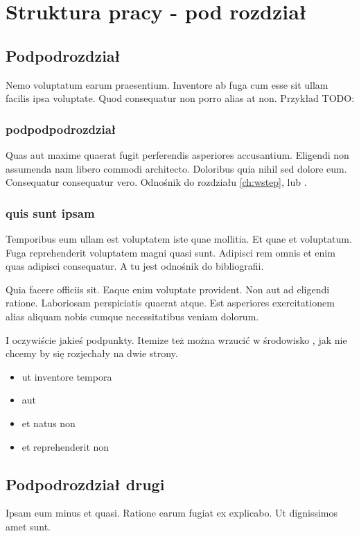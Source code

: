 \section{Struktura pracy - pod rozdział}

\subsection{Podpodrozdział}

Nemo voluptatum earum praesentium. Inventore ab fuga cum esse sit ullam facilis ipsa voluptate. Quod consequatur non porro alias at non. Przykład TODO:

\todo

\subsubsection{podpodpodrozdział}
Quas aut maxime quaerat fugit perferendis asperiores accusantium. Eligendi non assumenda nam libero commodi architecto. Doloribus quia nihil sed dolore eum. Consequatur consequatur vero.
Odnośnik do rozdziału \ref{ch:wstep}, lub .

\subsubsection{quis sunt ipsam}
Temporibus eum ullam est voluptatem iste quae mollitia. Et quae et voluptatum. Fuga reprehenderit voluptatem magni quasi sunt. Adipisci rem omnis et enim quas adipisci consequatur. A tu jest odnośnik do bibliografii.

Quia facere officiis sit. Eaque enim voluptate provident. Non aut ad eligendi ratione. Laboriosam perspiciatis quaerat atque. Est asperiores exercitationem alias aliquam nobis cumque necessitatibus veniam dolorum.

I oczywiście jakieś podpunkty. Itemize też można wrzucić w środowisko , jak nie chcemy by się rozjechały na dwie strony.

\begin{itemize}
    \item ut inventore tempora
    \item aut
    \item et natus non
    \item et reprehenderit non
\end{itemize}

\subsection{Podpodrozdział drugi}
Ipsam eum minus et quasi. Ratione earum fugiat ex explicabo. Ut dignissimos amet sunt.

